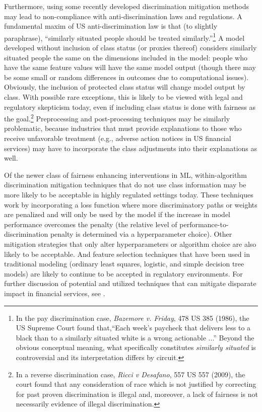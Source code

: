 \documentclass[information,article,submit,moreauthors,pdftex]{definitions/mdpi}
\begin{document}
Furthermore, using some recently developed discrimination mitigation methods may lead to non-compliance with anti-discrimination laws and regulations.  A fundamental maxim of US anti-discrimination law is that (to slightly paraphrase), ``similarly situated people should be treated similarly.''\footnote{In the pay discrimination case, \textit{Bazemore v. Friday}, 478 US 385 (1986), the US Supreme Court found that,``Each week's paycheck that delivers less to a black than to a similarly situated white is a wrong actionable ...''  Beyond the obvious conceptual meaning, what specifically constitutes \textit{similarly situated} is controversial and its interpretation differs by circuit.} A model developed without inclusion of class status (or proxies thereof) considers similarly situated people the same on the dimensions included in the model: people who have the same feature values will have the same model output (though there may be some small or random differences in outcomes due to computational issues). Obviously, the inclusion of protected class status will change model output by class. With possible rare exceptions, this is likely to be viewed with legal and regulatory skepticism today, even if including class status is done with fairness as the goal.\footnote{In a reverse discrimination case, \textit{Ricci v Desafano}, 557 US 557 (2009), the court found that any consideration of race which is not justified by correcting for past proven discrimination is illegal and, moreover, a lack of fairness is not necessarily evidence of illegal discrimination.}  Preprocessing and post-processing techniques may be similarly problematic, because industries that must provide explanations to those who receive unfavorable treatment (e.g., adverse action notices in US financial services) may have to incorporate the class adjustments into their explanations as well.

Of the newer class of fairness enhancing interventions in ML, within-algorithm discrimination mitigation techniques that do not use class information may be more likely to be acceptable in highly regulated settings today. These techniques work by incorporating a loss function where more discriminatory paths or weights are penalized and will only be used by the model if the increase in model performance overcomes the penalty (the relative level of performance-to-discrimination penalty is determined via a hyperparameter choice). Other mitigation strategies that only alter hyperparameters or algorithm choice are also likely to be acceptable. And feature selection techniques that have been used in traditional modeling (ordinary least squares, logistic, and simple decision tree models) are likely to continue to be accepted in regulatory environments.  For further discussion of potential and utilized techniques that can mitigate disparate impact in financial services, see \citet{schmidt2019introduction}. 
\end{document}
